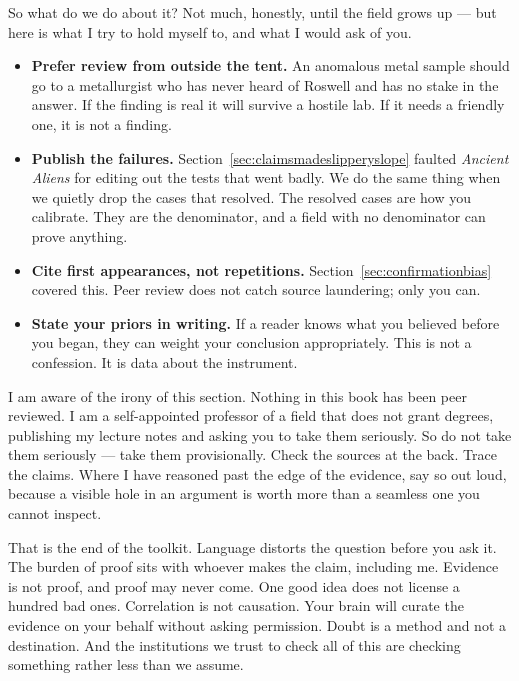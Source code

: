 So what do we do about it? Not much, honestly, until the field grows up --- but here
is what I try to hold myself to, and what I would ask of you.

\begin{itemize}[leftmargin=1.4em,itemsep=3pt]
  \item \textbf{Prefer review from outside the tent.} An anomalous metal sample should
  go to a metallurgist who has never heard of Roswell and has no stake in the answer.
  If the finding is real it will survive a hostile lab. If it needs a friendly one, it
  is not a finding.
  \item \textbf{Publish the failures.} Section~\ref{sec:claimsmadeslipperyslope} faulted \emph{Ancient Aliens} for
  editing out the tests that went badly. We do the same thing when we quietly drop the
  cases that resolved. The resolved cases are how you calibrate. They are the
  denominator, and a field with no denominator can prove anything.
  \item \textbf{Cite first appearances, not repetitions.} Section~\ref{sec:confirmationbias} covered this.
  Peer review does not catch source laundering; only you can.
  \item \textbf{State your priors in writing.} If a reader knows what you believed
  before you began, they can weight your conclusion appropriately. This is not a
  confession. It is data about the instrument.
\end{itemize}

I am aware of the irony of this section. Nothing in this book has been peer reviewed.
I am a self-appointed professor of a field that does not grant degrees, publishing my
lecture notes and asking you to take them seriously. So do not take them seriously ---
take them provisionally. Check the sources at the back. Trace the claims. Where I have
reasoned past the edge of the evidence, say so out loud, because a visible hole in an argument is
worth more than a seamless one you cannot inspect.

That is the end of the toolkit. Language distorts the question before you ask it. The
burden of proof sits with whoever makes the claim, including me. Evidence is not proof,
and proof may never come. One good idea does not license a hundred bad ones.
Correlation is not causation. Your brain will curate the evidence on your behalf
without asking permission. Doubt is a method and not a destination. And the
institutions we trust to check all of this are checking something rather less than we
assume.

